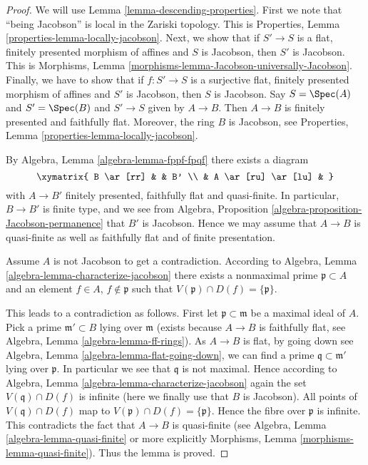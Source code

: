 \begin{proof}
We will use Lemma \ref{lemma-descending-properties}.
First we note that ``being Jacobson'' is local
in the Zariski topology. This is
Properties, Lemma \ref{properties-lemma-locally-jacobson}.
Next, we show that if $S' \to S$ is a flat, finitely presented
morphism of affines and $S$ is Jacobson, then $S'$ is
Jacobson. This is
Morphisms, Lemma \ref{morphisms-lemma-Jacobson-universally-Jacobson}.
Finally, we have to show that if $f : S' \to S$ is a surjective
flat, finitely presented morphism of affines and $S'$ is
Jacobson, then $S$ is Jacobson. Say $S = \Spec(A)$ and
$S' = \Spec(B)$ and $S' \to S$ given by $A \to B$.
Then $A \to B$ is finitely presented and faithfully flat.
Moreover, the ring $B$ is Jacobson, see
Properties, Lemma \ref{properties-lemma-locally-jacobson}.

\medskip\noindent
By Algebra, Lemma \ref{algebra-lemma-fppf-fpqf} there exists a diagram
$$
\xymatrix{
B \ar[rr] & & B' \\
& A \ar[ru] \ar[lu] &
}
$$
with $A \to B'$ finitely presented, faithfully flat and quasi-finite.
In particular, $B \to B'$ is finite type, and we see from
Algebra, Proposition \ref{algebra-proposition-Jacobson-permanence}
that $B'$ is Jacobson. Hence we may assume that $A \to B$ is quasi-finite
as well as faithfully flat and of finite presentation.

\medskip\noindent
Assume $A$ is not Jacobson to get a contradiction.
According to Algebra, Lemma \ref{algebra-lemma-characterize-jacobson}
there exists a nonmaximal prime $\mathfrak p \subset A$ and
an element $f \in A$, $f \not \in \mathfrak p$ such that
$V(\mathfrak p) \cap D(f) = \{\mathfrak p\}$.

\medskip\noindent
This leads to a contradiction as follows. First let
$\mathfrak p \subset \mathfrak m$ be a maximal ideal of $A$.
Pick a prime $\mathfrak m' \subset B$ lying over $\mathfrak m$
(exists because $A \to B$ is faithfully flat, see
Algebra, Lemma \ref{algebra-lemma-ff-rings}).
As $A \to B$ is flat, by going down see
Algebra, Lemma \ref{algebra-lemma-flat-going-down},
we can find a prime $\mathfrak q \subset \mathfrak m'$ lying over
$\mathfrak p$. In particular we see that $\mathfrak q$ is not
maximal. Hence according to
Algebra, Lemma \ref{algebra-lemma-characterize-jacobson} again
the set $V(\mathfrak q) \cap D(f)$ is infinite
(here we finally use that $B$ is Jacobson).
All points of $V(\mathfrak q) \cap D(f)$ map to
$V(\mathfrak p) \cap D(f) = \{\mathfrak p\}$. Hence the
fibre over $\mathfrak p$ is infinite. This contradicts the
fact that $A \to B$ is quasi-finite (see
Algebra, Lemma \ref{algebra-lemma-quasi-finite}
or more explicitly
Morphisms, Lemma \ref{morphisms-lemma-quasi-finite}).
Thus the lemma is proved.
\end{proof}

